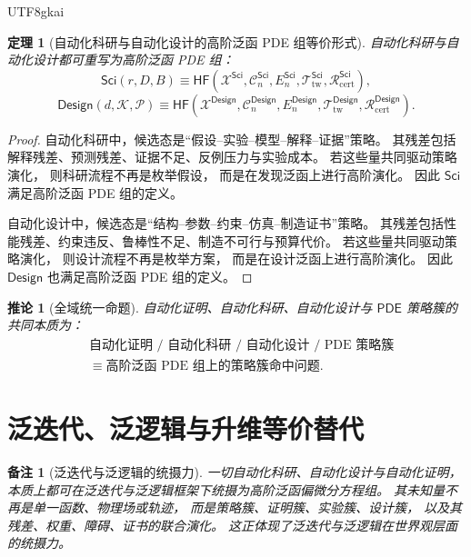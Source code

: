 \documentclass[12pt]{article}
\newtheorem{theorem}{定理}[section]
\newtheorem{corollary}{推论}[section]
\newtheorem{remark}{备注}[section]
\newcommand{\PDE}{\mathsf{PDE}}
\newcommand{\SciAuto}{\mathsf{Sci}}
\newcommand{\DesignAuto}{\mathsf{Design}}
\newcommand{\HF}{\mathsf{HF}}
\begin{document}
\begin{CJK*}{UTF8}{gkai}
\begin{theorem}[自动化科研与自动化设计的高阶泛函 PDE 组等价形式]
\label{thm:tex53-science-design-hf}
自动化科研与自动化设计都可重写为高阶泛函 PDE 组：
\[
  \SciAuto(r,D,B)
  \equiv
  \HF(
    \mathcal X^{\SciAuto},
    \mathcal C^{\SciAuto}_n,
    E^{\SciAuto}_n,
    \mathcal T^{\SciAuto}_{\mathrm{tw}},
    \mathcal R^{\SciAuto}_{\mathrm{cert}}
  ),
\]
\[
  \DesignAuto(d,\mathcal K,\mathcal P)
  \equiv
  \HF(
    \mathcal X^{\DesignAuto},
    \mathcal C^{\DesignAuto}_n,
    E^{\DesignAuto}_n,
    \mathcal T^{\DesignAuto}_{\mathrm{tw}},
    \mathcal R^{\DesignAuto}_{\mathrm{cert}}
  ).
\]
\end{theorem}

\begin{proof}
自动化科研中，候选态是“假设--实验--模型--解释--证据”策略。
其残差包括解释残差、预测残差、证据不足、反例压力与实验成本。
若这些量共同驱动策略演化，
则科研流程不再是枚举假设，
而是在发现泛函上进行高阶演化。
因此 \(\SciAuto\) 满足高阶泛函 PDE 组的定义。

自动化设计中，候选态是“结构--参数--约束--仿真--制造证书”策略。
其残差包括性能残差、约束违反、鲁棒性不足、制造不可行与预算代价。
若这些量共同驱动策略演化，
则设计流程不再是枚举方案，
而是在设计泛函上进行高阶演化。
因此 \(\DesignAuto\) 也满足高阶泛函 PDE 组的定义。
\end{proof}

\begin{corollary}[全域统一命题]
\label{cor:tex53-global-equivalence}
自动化证明、自动化科研、自动化设计与 \(\PDE\) 策略簇的共同本质为：
\[
  \boxed{
    \begin{aligned}
      &\text{自动化证明 / 自动化科研 / 自动化设计 / PDE 策略簇}\\
      &\equiv
      \text{高阶泛函 PDE 组上的策略簇命中问题}.
    \end{aligned}
  }
\]
\end{corollary}

\section{泛迭代、泛逻辑与升维等价替代}
\label{sec:tex53-pan-iteration-equivalent-lift}

\begin{remark}[泛迭代与泛逻辑的统摄力]
一切自动化科研、自动化设计与自动化证明，
本质上都可在泛迭代与泛逻辑框架下统摄为高阶泛函偏微分方程组。
其未知量不再是单一函数、物理场或轨迹，
而是策略簇、证明簇、实验簇、设计簇，
以及其残差、权重、障碍、证书的联合演化。
这正体现了泛迭代与泛逻辑在世界观层面的统摄力。


\end{remark}
\end{CJK*}
\end{document}

